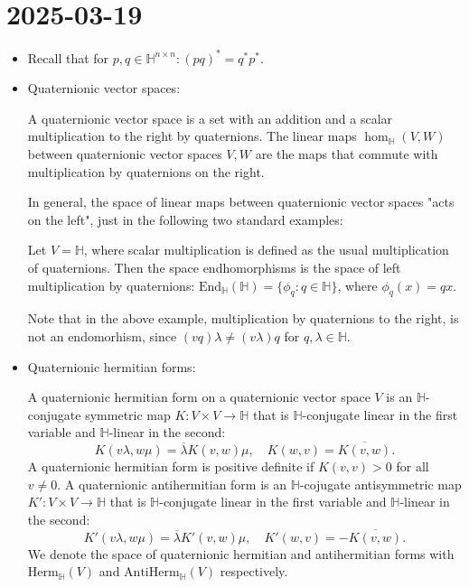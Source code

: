 \documentclass{report}
\begin{document}
\section{2025-03-19}
\begin{itemize}
    \item Recall that for $p,q \in \mathbb H^{n \times n}: (pq)^* = q^* p^*$.
    \item Quaternionic vector spaces:
    \begin{definition}
        A quaternionic vector space is a set with an addition and a scalar multiplication to the right by quaternions.
        The linear maps $\hom_\mathbb H(V, W)$ between quaternionic vector spaces $V, W$ are the maps that commute with multiplication by quaternions on the right.
    \end{definition}
    In general, the space of linear maps between quaternionic vector spaces "acts on the left", just in the following two standard examples:
    \begin{example}
        Let $V = \mathbb H$, where scalar multiplication is defined as the usual multiplication of quaternions.
        Then the space endhomorphisms is the space of left multiplication by quaternions: $\mathrm{End}_\mathbb H(\mathbb H) = \{ \phi_q : q \in \mathbb H\}$, where $\phi_q(x) = qx$.
    \end{example}
    Note that in the above example, multiplication by quaternions to the right, is not an endomorhism, since $(vq)\lambda \neq (v \lambda) q$ for $q, \lambda \in \mathbb H$.
    \item Quaternionic hermitian forms:
    \begin{definition}
        A quaternionic hermitian form on a quaternionic vector space $V$ is an $\mathbb H$-conjugate symmetric map $K: V \times V \to \mathbb H$ that is $\mathbb H$-conjugate linear in the first variable and $\mathbb H$-linear in the second:
        \[
        K(v \lambda, w \mu) = \overline \lambda K(v, w) \mu,\quad
        K(w, v) = \overline{K(v,w)}.
        \]
        A quaternionic hermitian form is positive definite if $K(v,v) > 0$ for all $v \neq 0$.
        A quaternionic antihermitian form is an $\mathbb H$-cojugate antisymmetric map $K': V \times V \to \mathbb H$ that is $\mathbb H$-conjugate linear in the first variable and $\mathbb H$-linear in the second:
        \[
            K'(v \lambda, w \mu) = \overline \lambda K'(v, w) \mu,\quad
            K'(w, v) = -\overline{K(v,w)}.
        \]
        We denote the space of quaternionic hermitian and antihermitian forms with $\mathrm{Herm}_\mathbb H(V)$ and $\mathrm{AntiHerm}_\mathbb H(V)$ respectively.

\end{definition}
\end{itemize}
\end{document}
